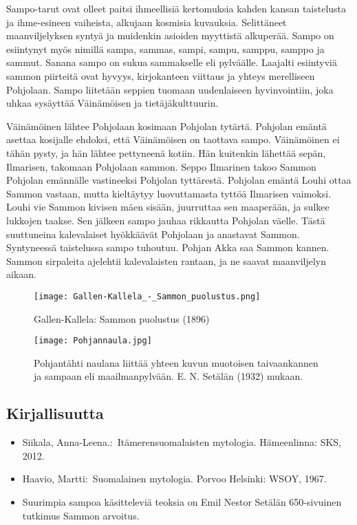   Sampo-tarut ovat olleet paitsi ihmeellisiä kertomuksia kahden kansan taistelusta ja 
  ihme-esineen vaiheista, alkujaan kosmisia kuvauksia. Selittäneet maanviljelyksen syntyä ja 
  muidenkin asioiden myyttistä alkuperää. Sampo on esiintynyt myös nimillä sampa, sammas, sampi, 
  sampu, samppu, samppo ja sammut. Sanana sampo on sukua sammakselle eli pylväälle. Laajalti 
  esiintyviä sammon piirteitä ovat hyvyys, kirjokanteen viittaus ja yhteys merelliseen Pohjolaan. 
  Sampo liitetään seppien tuomaan uudenlaiseen hyvinvointiin, joka uhkaa sysäyttää Väinämöisen 
  ja tietäjäkulttuurin.

  Väinämöinen lähtee Pohjolaan kosimaan Pohjolan tytärtä. Pohjolan emäntä asettaa kosijalle 
  ehdoksi, että Väinämöisen on taottava sampo. Väinämöinen ei tähän pysty, ja hän lähtee 
  pettyneenä kotiin. Hän kuitenkin lähettää sepän, Ilmarisen, takomaan Pohjolaan sammon. Seppo 
  Ilmarinen takoo Sammon Pohjolan emännälle vastineeksi Pohjolan tyttärestä. Pohjolan emäntä 
  Louhi ottaa Sammon vastaan, mutta kieltäytyy luovuttamasta tyttöä Ilmarisen vaimoksi. Louhi vie 
  Sammon kivisen mäen sisään, juurruttaa sen maaperään, ja sulkee lukkojen taakse. Sen jälkeen 
  sampo jauhaa rikkautta Pohjolan väelle. Tästä suuttuneina kalevalaiset hyökkäävät Pohjolaan ja 
  anastavat Sammon. Syntyneessä taistelussa sampo tuhoutuu. Pohjan Akka saa Sammon kannen. Sammon 
  sirpaleita ajelehtii kalevalaisten rantaan, ja ne saavat maanviljelyn aikaan.
 
 
  \begin{figure}[!hb]
    \caption{Gallen-Kallela: Sammon puolustus (1896)}
    \centering
    \texttt{[image: Gallen-Kallela\_-\_Sammon\_puolustus.png]}
  \end{figure}  

  \begin{figure}[!hb]
    \caption{Pohjantähti naulana liittää yhteen kuvun muotoisen taivaankannen ja sampaan eli maailmanpylvään. E. N. Setälän (1932) mukaan.}
    \centering
    \texttt{[image: Pohjannaula.jpg]}
  \end{figure}  
  
  
  
\subsection{Kirjallisuutta}

  \begin{itemize}
    \item Siikala, Anna-Leena.: Itämerensuomalaisten mytologia. Hämeenlinna: SKS, 2012. 
    \item Haavio, Martti: Suomalainen mytologia. Porvoo Helsinki: WSOY, 1967. 
    \item Suurimpia sampoa käsitteleviä teoksia on Emil Nestor Setälän 650-sivuinen tutkimus Sammon arvoitus.
  \end{itemize}

